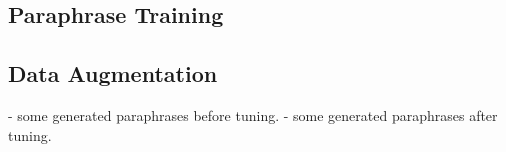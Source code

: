 \documentclass[11pt]{article}
\begin{document}
\subsection{Paraphrase Training}

\subsection{Data Augmentation}
- some generated paraphrases before tuning.
- some generated paraphrases after tuning.

\begin{comment}
\begin{table*}
\centering
\caption{The average accuracy (standard deviation) on the dev set of the SST2 binary sentiment classification task with the Roberta-Large LM trained in the fewshot setting using only 16 train examples per label. The results are averaged after sampling 32 examples for the train and validation splits using five different random seeds.$\dagger$ is the reported performance of the fine-tuned Roberta-Large on all of the training dataset.}

\begin{tabular}{c | c | c | c | c | c | c}
\hline
LM Tuning Method & Normal Train Data & +AUG & +AUG$_{avg}$ & +PAR & +PAR$_{avg}$ \\
\hline
\cite{DBLP:journals/corr/abs-1907-11692}$\dagger$ & 96.4 & n/a & n/a & n/a & n/a\\
\hline
with instruction - no LM train & 86.8 & 86.8 & 83.1 & 86.8 & 83.1\\
\hline
all\_finetune & 91.3 \small$\pm$\small1.2 & 91.0 \small$\pm$\small1.6 & 91.1 \small$\pm$\small1.6 & {\color{green}91.7} \small$\pm$\small1.3 & {\color{green}92.0} \small$\pm$\small1.6\\
input\_finetune & 89.7 \small$\pm$\small0.5 & {\color{green}91.1} \small$\pm$\small0.6 & {\color{green}91.4} \small$\pm$\small0.3 & {\color{green}90.2} \small$\pm$\small0.8 & {\color{green}91.1} \small$\pm$\small1.0\\
output\_finetune & 87.2 \small$\pm$\small3.3 & 86.5 \small$\pm$\small2.5 & 86.5 \small$\pm$\small2.8 & 86.1 \small$\pm$\small2.6 & 86.4 \small$\pm$\small2.4\\
classifier\_finetune & 64.5 \small$\pm$\small2.7 &  64.9 \small$\pm$\small4.6 & 64.9 \small$\pm$\small5.6 & {\color{green}66.7} \small$\pm$\small2.3 & {\color{green}66.5} \small$\pm$\small2.5 \\
\hline
prompt tune & 79.9 \small$\pm$\small7.5 & {\color{green}88.3} \small$\pm$\small5.0 & {\color{green}88.9} \small$\pm$\small4.8 & {\color{green}88.6} \small$\pm$\small3.3 & {\color{green}88.8} \small$\pm$\small3.1\\
gradient search & 86.5 \small$\pm$\small2.9 & {\color{green}89.0} \small$\pm$\small1.5 & {\color{green}88.2} \small$\pm$\small1.7 &
\end{tabular}
\label{sst2}
\end{table*}

\end{comment}
\end{document}
